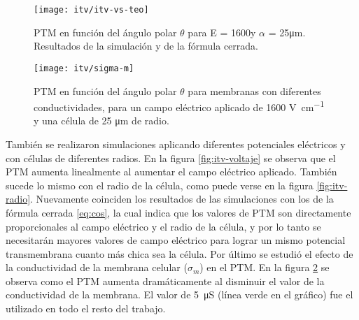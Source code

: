 \begin{figure}
	\texttt{[image: itv/itv-vs-teo]}
	\caption{PTM en función del ángulo polar $\theta$ para E = 1600\vcm y $\alpha$ = 25\si{\micro\metre}. Resultados de la simulación y de la fórmula cerrada.}
	\label{fig:itv-vs-teo}
\end{figure}

\clearpage


\begin{figure}[h!]\centering
	\texttt{[image: itv/sigma-m]}
	\caption{PTM en función del ángulo polar $\theta$ para membranas con diferentes conductividades, para un campo eléctrico aplicado de 1600 \si{\volt\per\centi\metre} y una célula de 25 \si{\micro\metre} de radio.}
	\label{fig:sigma-m}
\end{figure}

También se realizaron simulaciones aplicando diferentes potenciales eléctricos y con células de diferentes radios. En la figura \ref{fig:itv-voltaje} se observa que el PTM aumenta linealmente al aumentar el campo eléctrico aplicado. También sucede lo mismo con el radio de la célula, como puede verse en la figura \ref{fig:itv-radio}. Nuevamente coinciden los resultados de las simulaciones con los de la fórmula cerrada \ref{eq:cos}, la cual indica que los valores de PTM son directamente proporcionales al campo eléctrico y el radio de la célula, y por lo tanto se necesitarán mayores valores de campo eléctrico para lograr un mismo potencial transmembrana cuanto más chica sea la célula. Por último se estudió el efecto de la conductividad de la membrana celular ($\sigma_m$) en el PTM. En la figura \ref{fig:sigma-m} se observa como el PTM aumenta dramáticamente al disminuir el valor de la conductividad de la membrana. El valor de \mbox{5 \si{\micro\siemens}} (línea verde en el gráfico) fue el utilizado en todo el resto del trabajo.
